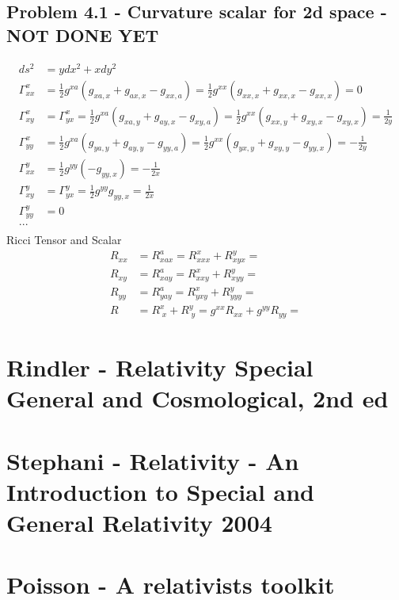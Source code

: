 \documentclass[10pt,a4paper]{book}
\theoremstyle{definition}
\begin{document}
\subsection{Problem 4.1 - Curvature scalar for 2d space - NOT DONE YET}
\begin{align}
ds^2&=ydx^2+xdy^2\\
\Gamma^x_{xx}&=\frac{1}{2}g^{xa}(g_{xa,x}+g_{ax,x}-g_{xx,a})=\frac{1}{2}g^{xx}(g_{xx,x}+g_{xx,x}-g_{xx,x})=0\\
\Gamma^x_{xy}&=\Gamma^x_{yx}=\frac{1}{2}g^{xa}(g_{xa,y}+g_{ay,x}-g_{xy,a})=\frac{1}{2}g^{xx}(g_{xx,y}+g_{xy,x}-g_{xy,x})=\frac{1}{2y}\\
\Gamma^x_{yy}&=\frac{1}{2}g^{xa}(g_{ya,y}+g_{ay,y}-g_{yy,a})=\frac{1}{2}g^{xx}(g_{yx,y}+g_{xy,y}-g_{yy,x})=-\frac{1}{2y}\\
\Gamma^y_{xx}&=\frac{1}{2}g^{yy}(-g_{yy,x})=-\frac{1}{2x}\\
\Gamma^y_{xy}&=\Gamma^y_{yx}=\frac{1}{2}g^{yy}g_{yy,x}=\frac{1}{2x}\\
\Gamma^y_{yy}&=0\\
...&\\
\end{align}
Ricci Tensor and Scalar
\begin{align}
R_{xx}&=R^a_{xax}=R^x_{xxx}+R^y_{xyx}=\\
R_{xy}&=R^a_{xay}=R^x_{xxy}+R^y_{xyy}=\\
R_{yy}&=R^a_{yay}=R^x_{yxy}+R^y_{yyy}=\\
R&=R^x_{\;x}+R^y_{\;y}=g^{xx}R_{xx}+g^{yy}R_{yy}=
\end{align}



\section{{\sc Rindler} - Relativity Special General and Cosmological, 2nd ed}

\section{{\sc Stephani} - Relativity - An Introduction to Special and General Relativity 2004}

\section{{\sc Poisson} - A relativists toolkit}
\end{document}

